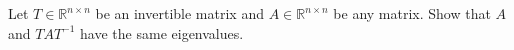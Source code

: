 Let $T \in \mathbb{R}^{n \times n}$ be an invertible matrix and $A \in \mathbb{R}^{n \times n}$ be any matrix. Show that $A$ and $T A T^{-1}$ have the same eigenvalues.\\


 
